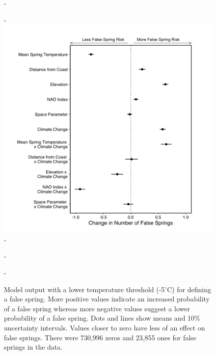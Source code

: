 \documentclass{article}\usepackage[]{graphicx}\usepackage[]{color}
\begin{document}
{{\begin{figure} [H]
  -\begin{center}
  -\includegraphics[width=12cm]{..//analyses/figures/model_output_90_five.png}
  -\caption{Model output with a lower temperature threshold (-5$^{\circ}$C) for defining a false spring. More positive values indicate an increased probability of a false spring whereas more negative values suggest a lower probability of a false spring. Dots and lines show means and 10\% uncertainty intervals. Values closer to zero have less of an effect on false springs. There were 730,996 zeros and 23,855 ones for false springs in the data.}\label{fig:five}
  -\end{center}
  -\end{figure}}
  
}
\end{document}
